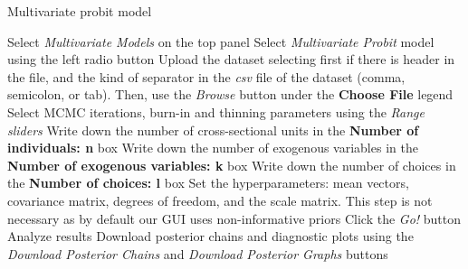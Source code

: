 \begin{algorithm}[h!]
	\caption{Multivariate probit model}\label{alg:MtultProbit}
	\begin{algorithmic}[1]  		 			
		\State Select \textit{Multivariate Models} on the top panel
		\State Select \textit{Multivariate Probit} model using the left radio button
		\State Upload the dataset selecting first if there is header in the file, and the kind of separator in the \textit{csv} file of the dataset (comma, semicolon, or tab). Then, use the \textit{Browse} button under the \textbf{Choose File} legend
		\State Select MCMC iterations, burn-in and thinning parameters using the \textit{Range sliders}
		\State Write down the number of cross-sectional units in the \textbf{Number of individuals: n} box
		\State Write down the number of exogenous variables in the \textbf{Number of exogenous variables: k} box
		\State Write down the number of choices in the \textbf{Number of choices: l} box
		\State Set the hyperparameters: mean vectors, covariance matrix, degrees of freedom, and the scale matrix. This step is not necessary as by default our GUI uses non-informative priors
		\State Click the \textit{Go!} button
		\State Analyze results
		\State Download posterior chains and diagnostic plots using the \textit{Download Posterior Chains} and \textit{Download Posterior Graphs} buttons
	\end{algorithmic} 
\end{algorithm}


